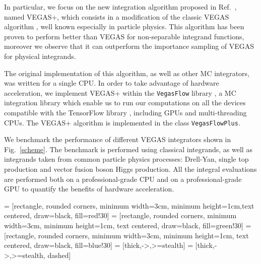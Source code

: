 \documentclass[../main/main.tex]{subfiles}
\begin{document}
In particular, we focus on the new integration algorithm proposed in Ref.~\cite{Lepage:2020tgj}, named VEGAS+, which consists in a modification of the classic VEGAS algorithm \cite{Lepage:1977sw}, well known especially in particle physics. This algorithm has been proven to perform better than VEGAS for non-separable integrand functions, moreover we observe that it can outperform the importance sampling of VEGAS for physical integrands.

The original implementation of this algorithm, as well as other MC integrators, was written for a single CPU. In order to take advantage of hardware acceleration, we implement VEGAS+ within the \texttt{VegasFlow} library \cite{vegasflow_package},  a MC integration library which enable us to run our computations on all the devices compatible with the TensorFlow library \cite{tensorflow2015-whitepaper}, including GPUs and multi-threading CPUs. The VEGAS+ algorithm is implemented in the class \texttt{VegasFlowPlus}.

We benchmark the performance of different VEGAS integrators shown in Fig.~\ref{scheme}.
The benchmark is performed using classical integrands, as well as integrands taken from common particle physics processes: Drell-Yan, single top production and vector fusion boson Higgs production. All the integral evaluations are performed both on a professional-grade CPU and on a professional-grade GPU to quantify the benefits of hardware acceleration.

 = [rectangle, rounded corners, minimum width=3cm, minimum height=1cm,text centered, draw=black, fill=red!30]
 = [rectangle, rounded corners, minimum width=3cm, minimum height=1cm, text centered, draw=black, fill=green!30]
 = [rectangle, rounded corners, minimum width=3cm, minimum height=1cm, text centered, draw=black, fill=blue!30]
 = [thick,->,>=stealth]
 = [thick,->,>=stealth, dashed]
\end{document}
